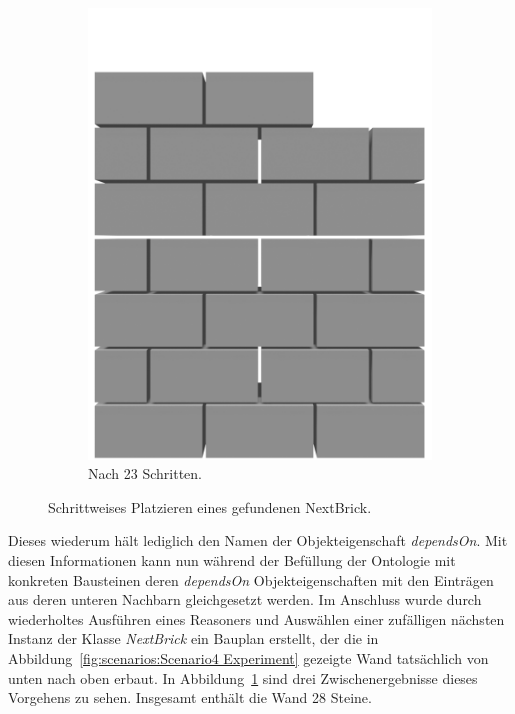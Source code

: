 \begin{figure}[t!]
\begin{subfigure}[b]{0.3\columnwidth}
    \includegraphics[width=\columnwidth]{fig/scenario4_output_23_render.png}
    \caption{Nach 23 Schritten.}
  \end{subfigure}
  \hspace*{\fill}%
  \caption{Schrittweises Platzieren eines gefundenen NextBrick.}\label{fig:poc:result_scenario4}
\end{figure}
Dieses wiederum hält lediglich den Namen der Objekteigenschaft \textit{dependsOn}.
Mit diesen Informationen kann nun während der Befüllung der Ontologie mit konkreten Bausteinen deren \textit{dependsOn} Objekteigenschaften mit den Einträgen aus deren unteren Nachbarn gleichgesetzt werden.
Im Anschluss wurde durch wiederholtes Ausführen eines Reasoners und Auswählen einer zufälligen nächsten Instanz der Klasse {\textit{NextBrick}} ein Bauplan erstellt, der die in Abbildung~\ref{fig:scenarios:Scenario4 Experiment} gezeigte Wand tatsächlich von unten nach oben erbaut.
In Abbildung~\ref{fig:poc:result_scenario4} sind drei Zwischenergebnisse dieses Vorgehens zu sehen.
Insgesamt enthält die Wand 28 Steine.

